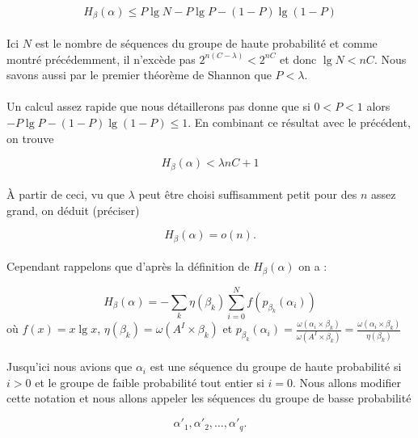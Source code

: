 	\[H_\beta(\alpha)\le P\lg N - P\lg P - (1-P)\lg(1-P)\]
	
	\paragraph{}
	Ici $N$ est le nombre de séquences du groupe de haute probabilité et comme montré précédemment, il n'excède pas $2^{n(C-\lambda)}<2^{nC}$
	et donc $\lg N<nC$. Nous savons aussi par le premier théorème de Shannon que $P<\lambda$.
	
	\paragraph{}
	Un calcul assez rapide que nous détaillerons pas donne que si $0<P<1$ alors $-P\lg P -(1-P)\lg(1-P)\le 1$. En combinant ce résultat avec le précédent, on trouve
	
	\[H_\beta(\alpha) < \lambda nC + 1\]
	
	\paragraph{}
	À partir de ceci, vu que $\lambda$ peut être choisi suffisamment petit pour des $n$ assez grand, on déduit (préciser)
	
	\[H_\beta(\alpha)=o(n).\]
	
	\paragraph{}
	Cependant rappelons que d'après la définition de $H_\beta(\alpha)$ on a :
	
	\[H_\beta(\alpha) = - \sum_k\eta(\beta_k)\sum_{i=0}^Nf(p_{\beta_k}(\alpha_i))\]
	où $f(x) = x \lg x$, $\eta(\beta_k) = \omega(A^I \times \beta_k)$ 
	et $p_{\beta_k}(\alpha_i) = \frac{\omega(\alpha_i \times \beta_k)}{\omega(A^I \times \beta_k)}=\frac{\omega(\alpha_i \times \beta_k)}{\eta(\beta_k)}$	
	
	\paragraph{}
	Jusqu'ici nous avions que $\alpha_i$ est une séquence du groupe de haute probabilité si $i>0$ et le groupe de faible probabilité tout entier si $i=0$.
	Nous allons modifier cette notation et nous allons appeler les séquences du groupe de basse probabilité 
	
	\[\alpha'_1, \alpha'_2, \dots, \alpha'_q.\]
	
